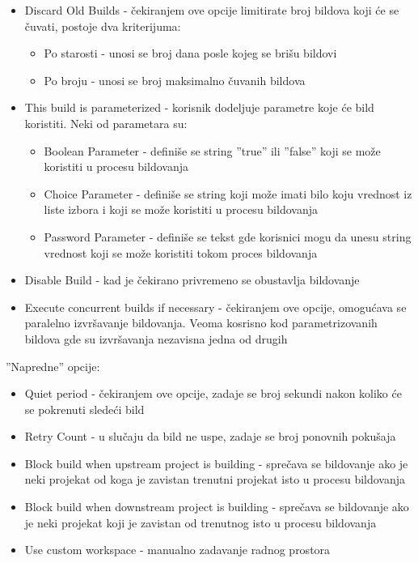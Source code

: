 \begin{itemize}  
\item Discard Old Builds - čekiranjem ove opcije limitirate broj bildova koji će se čuvati, postoje dva kriterijuma:
\begin{itemize}
\item Po starosti - unosi se broj dana posle kojeg se brišu bildovi
\item Po broju - unosi se broj maksimalno čuvanih bildova
\end{itemize}
\item This build is parameterized - korisnik dodeljuje parametre koje će bild koristiti. Neki od parametara su:
\begin{itemize}
\item Boolean Parameter - definiše se string ''true'' ili ''false'' koji se može koristiti u procesu bildovanja
\item Choice Parameter - definiše se string koji može imati bilo koju vrednost iz liste izbora i koji se može koristiti u procesu bildovanja
\item Password Parameter - definiše se tekst gde korisnici mogu da unesu string vrednost koji se može koristiti tokom proces bildovanja
\end{itemize}
\item Disable Build - kad je čekirano privremeno se obustavlja bildovanje
\item Execute concurrent builds if necessary - čekiranjem ove opcije, omogućava se paralelno izvršavanje bildovanja. Veoma kosrisno kod parametrizovanih bildova gde su izvršavanja nezavisna jedna od drugih
\end{itemize}

''Napredne'' opcije:
\begin{itemize}  
\item Quiet period - čekiranjem ove opcije, zadaje se broj sekundi nakon koliko će se pokrenuti sledeći bild
\item Retry Count - u slučaju da bild ne uspe, zadaje se broj ponovnih pokušaja
\item Block build when upstream project is building - sprečava se bildovanje ako je neki projekat od koga je zavistan trenutni projekat isto u procesu bildovanja
\item Block build when downstream project is building - sprečava se bildovanje ako je neki projekat koji je zavistan od trenutnog isto u procesu bildovanja
\item Use custom workspace - manualno zadavanje radnog prostora
\end{itemize}


